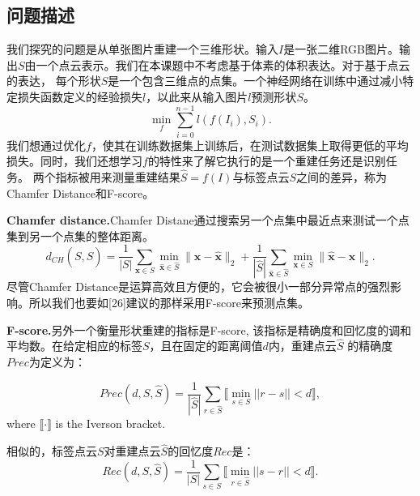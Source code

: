 \documentclass[bachelor, nocolorlinks, printoneside]{seuthesis} %
\begin{document}
\begin{Main}
\section{问题描述}
我们探究的问题是从单张图片重建一个三维形状。输入$I$是一张二维RGB图片。输出$S$由一个点云表示。我们在本课题中不考虑基于体素的体积表达。对于基于点云的表达，
每个形状$S$是一个包含三维点的点集。一个神经网络在训练中通过减小特定损失函数定义的经验损失$l$，以此来从输入图片$l$预测形状$S$。
\begin{equation}
    \min_f \sum_{i=0}^{n-1} {l(f(I_i), S_i)}.
\end{equation}
我们想通过优化$f$，使其在训练数据集上训练后，在测试数据集上取得更低的平均损失。同时，我们还想学习$f$的特性来了解它执行的是一个重建任务还是识别任务。
两个指标被用来测量重建结果$\widehat{S} = f(I)$与标签点云$S$之间的差异，称为Chamfer Distance和F-score。

\noindent
\textbf{Chamfer distance.}Chamfer Distane通过搜索另一个点集中最近点来测试一个点集到另一个点集的整体距离。
\begin{equation}\label{eqn:chamfer}
	d_{CH}(S,\widehat{S}) = \frac{1}{|S|}\sum\limits_{\mathbf{x}\in S}\min_{\widehat{\mathbf{x}}\in \widehat{S}}\|\mathbf{x}-\widehat{\mathbf{x}}\|_2 + 
    \frac{1}{|\widehat{S}|}\sum\limits_{\widehat{\mathbf{x}}\in \widehat{S}}\min_{\mathbf{x}\in S}\|\widehat{\mathbf{x}} - \mathbf{x}\|_2.
\end{equation}
尽管Chamfer Distance是运算高效且方便的，它会被很小一部分异常点的强烈影响。所以我们也要如[26]建议的那样采用F-score来预测点集。

\noindent
\textbf{F-score.}另外一个衡量形状重建的指标是F-score, 该指标是精确度和回忆度的调和平均数。在给定相应的标签$S$，且在固定的距离阈值$d$内，重建点云$\widehat{S}$
的精确度$\textit{Prec}$为定义为：

\begin{equation} \label{eq:precision}
\textit{Prec}(\textit{d}, S, \widehat{S}) = \frac{1}{|\widehat{S}|} \sum_{r \in \widehat{S}} \llbracket \min_{s \in S} ||r-s || < \textit{d} \rrbracket,
\end{equation}
where $\llbracket \cdot \rrbracket$ is the Iverson bracket.
    
相似的，标签点云$S$对重建点云$\widehat{S}$的回忆度$\textit{Rec}$是：
\begin{equation} \label{eq:recall}
    \textit{Rec}(\textit{d}, S, \widehat{S}) = \frac{1}{|S|} \sum_{s \in S} \llbracket \min_{r \in \widehat{S}} ||s-r || < \textit{d} \rrbracket.
    \end{equation}


\end{Main}
\end{document}
